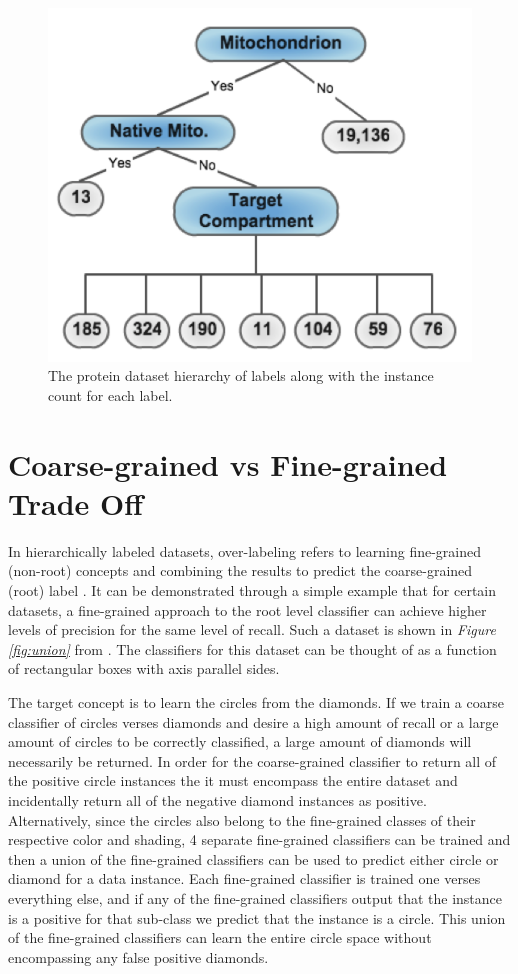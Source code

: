 \documentclass[ms]{nuthesis}
\begin{document}
\FloatBarrier
\begin{figure}[!htb]
	\centering
    \includegraphics[width=0.75\columnwidth]{fig/Mito_tree}
    \caption{The protein dataset hierarchy of labels along with the instance
    count for each label.}
    \label{fig:Mitotree}
\end{figure}
\FloatBarrier


\section{Coarse-grained vs Fine-grained Trade Off}
\par In hierarchically labeled datasets, over-labeling refers to learning fine-grained
(non-root) concepts and combining the results to predict the coarse-grained (root) label \cite{yugi}.
It can be demonstrated through a simple example
that for certain datasets, a fine-grained approach to the root level classifier can achieve higher
levels of precision for the same level of recall. Such a dataset is shown in \textit{Figure
\ref{fig:union}} from \cite{yugi}. The classifiers for this dataset can be thought of as a
function of rectangular boxes with axis parallel sides.

\par The target concept is to learn the circles from the diamonds. If we train a coarse classifier
of circles verses diamonds and desire a high amount of recall or a large amount of circles to be
correctly classified, a large amount of diamonds will
necessarily be returned. In order for the coarse-grained classifier to return all of the positive
circle instances the it must encompass the entire dataset
and incidentally return all of the negative diamond instances as
positive. Alternatively, since the circles also belong to the
fine-grained classes of their respective color and shading, 4 separate fine-grained classifiers
can be trained and then a union of the fine-grained classifiers can be used to predict either
circle or diamond for a data instance. Each fine-grained classifier is trained one verses everything
else, and if any of the fine-grained classifiers output that the instance is a positive for that
sub-class we predict that the instance is a circle. This union of the fine-grained classifiers
can learn the entire circle space without encompassing any false positive diamonds.
\end{document}
